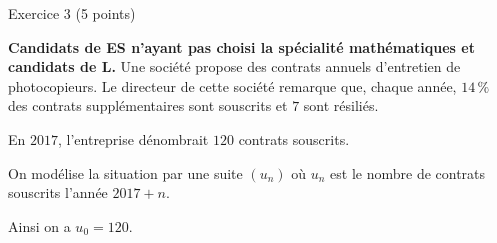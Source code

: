 
%
\begin{h2}Exercice 3 (5 points)\end{h2}
\textbf{Candidats de ES n'ayant pas choisi la spécialité \og mathématiques \fg{} et candidats de L.}
\medskip
Une société propose des contrats annuels d'entretien de photocopieurs. Le directeur de cette société remarque que, chaque année, $14\,\%$ des contrats supplémentaires sont souscrits et $7$ sont résiliés.
\par
En $2017$, l'entreprise dénombrait $120$ contrats souscrits.
\par
On modélise la situation par une suite $(u_n)$ où $u_n$ est le nombre de contrats souscrits l'année $2017+n$.
\par
Ainsi on a $u_0=120$.
